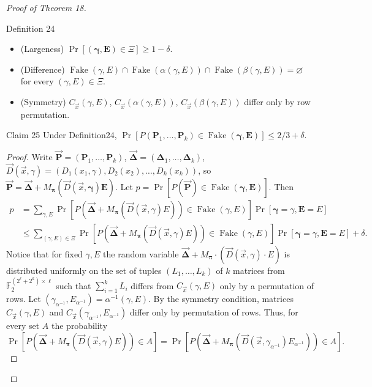 \begin{proof}[Proof of Theorem 18]
\begin{authorclaim}{Definition 24}
\begin{itemize}
\item (Largeness) $\Pr[(\boldsymbol\gamma,\mathbf E)\in\Xi]\ge1-\delta$.
\item (Difference) $\operatorname{Fake}(\gamma,E)\cap\operatorname{Fake}(\alpha(\gamma,E))\cap\operatorname{Fake}(\beta(\gamma,E))=\varnothing$ for every $(\gamma,E)\in\Xi$.
\item (Symmetry) $C_{\vec x}(\gamma,E)$, $C_{\vec x}(\alpha(\gamma,E))$, $C_{\vec x}(\beta(\gamma,E))$ differ only by row permutation.
\end{itemize}
\end{authorclaim}
\begin{authorclaim}{Claim 25}
Under Definition24, $\Pr[P(\mathbf P_1,\ldots,\mathbf P_k)\in\operatorname{Fake}(\boldsymbol\gamma,\mathbf E)]\le2/3+\delta$.
\end{authorclaim}
\begin{proof}
Write $\boldsymbol{\vec P}=(\mathbf P_1,\ldots,\mathbf P_k)$, $\boldsymbol{\vec\Delta}=(\boldsymbol\Delta_1,\ldots,\boldsymbol\Delta_k)$, $\vec D(\vec x,\gamma)=(D_1(x_1,\gamma),D_2(x_2),\ldots,D_k(x_k))$, so $\boldsymbol{\vec P}=\boldsymbol{\vec\Delta}+M_{\boldsymbol\pi}(\vec D(\vec x,\boldsymbol\gamma)\mathbf E)$.
Let $p=\Pr[P(\boldsymbol{\vec P})\in\operatorname{Fake}(\boldsymbol\gamma,\mathbf E)]$. Then
\begin{align*}
p&=\sum_{\gamma,E}\Pr[P(\boldsymbol{\vec\Delta}+M_{\boldsymbol\pi}(\vec D(\vec x,\gamma)E))\in\operatorname{Fake}(\gamma,E)]\Pr[\boldsymbol\gamma=\gamma,\mathbf E=E]\\
&\le\sum_{(\gamma,E)\in\Xi}\Pr[P(\boldsymbol{\vec\Delta}+M_{\boldsymbol\pi}(\vec D(\vec x,\gamma)E))\in\operatorname{Fake}(\gamma,E)]\Pr[\boldsymbol\gamma=\gamma,\mathbf E=E]+\delta .
\end{align*}
Notice that for fixed $\gamma,E$ the random variable $\boldsymbol{\vec\Delta}+M_{\boldsymbol\pi}\cdot(\vec D(\vec x,\gamma)\cdot E)$ is distributed uniformly on the set of tuples $(L_1,\ldots,L_k)$ of $k$ matrices from $\mathbb F_2^{(2^\ell+2^k)\times\ell}$ such that $\sum_{i=1}^kL_i$ differs from $C_{\vec x}(\gamma,E)$ only by a permutation of rows. Let $(\gamma_{\alpha^{-1}},E_{\alpha^{-1}})=\alpha^{-1}(\gamma,E)$. By the symmetry condition, matrices $C_{\vec x}(\gamma,E)$ and $C_{\vec x}(\gamma_{\alpha^{-1}},E_{\alpha^{-1}})$ differ only by permutation of rows. Thus, for every set $A$ the probability
\[
\Pr[P(\boldsymbol{\vec\Delta}+M_{\boldsymbol\pi}(\vec D(\vec x,\gamma)E))\in A]
=\Pr[P(\boldsymbol{\vec\Delta}+M_{\boldsymbol\pi}(\vec D(\vec x,\gamma_{\alpha^{-1}})E_{\alpha^{-1}}))\in A].
\]
\end{proof}
\end{proof}
